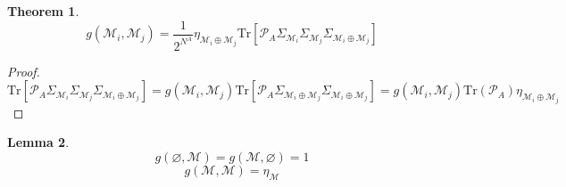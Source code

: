 \documentclass[12font]{article}
\newtheorem{theorem}{Theorem}[section]
\theoremstyle{definition}
\newtheorem{lemma}[theorem]{Lemma}
\numberwithin{equation}{section}
\newcommand{\lr}[1]{\left(  #1  \right)}
\newcommand{\lrm}[1]{\left[  #1  \right]}
\newcommand{\mrm}[1]{\mathrm{#1}}
\newcommand{\Tr}{\mrm{Tr}}
\begin{document}
\begin{theorem}
  \begin{equation}\label{g-function.e}
  g(\mathcal{M}_i,\mathcal{M}_j) = \frac{1}{2^{N^A}}\eta_{\mathcal{M}_i\oplus\mathcal{M}_j}\Tr\lrm{\mathcal{P}_A\Sigma_{\mathcal{M}_i}\Sigma_{\mathcal{M}_j}\Sigma_{\mathcal{M}_i\oplus\mathcal{M}_j}} 
\end{equation}
\end{theorem}
\begin{proof}
  \[
\Tr\lrm{\mathcal{P}_A\Sigma_{\mathcal{M}_i}\Sigma_{\mathcal{M}_j}\Sigma_{\mathcal{M}_i\oplus\mathcal{M}_j}} = g(\mathcal{M}_i,\mathcal{M}_j)\Tr\lrm{\mathcal{P}_A \Sigma_{\mathcal{M}_i\oplus\mathcal{M}_j}\Sigma_{\mathcal{M}_i\oplus\mathcal{M}_j}} = g(\mathcal{M}_i,\mathcal{M}_j)\Tr\lr{\mathcal{P}_A }\eta_{\mathcal{M}_i\oplus\mathcal{M}_j}
\]
\end{proof}

\begin{lemma}\label{g-self.thm}
  \[g(\varnothing, \mathcal{M}) = g(\mathcal{M},\varnothing)= 1\] \[g(\mathcal{M},\mathcal{M}) = \eta_{\mathcal{M}} \]
\end{lemma}
\end{document}
